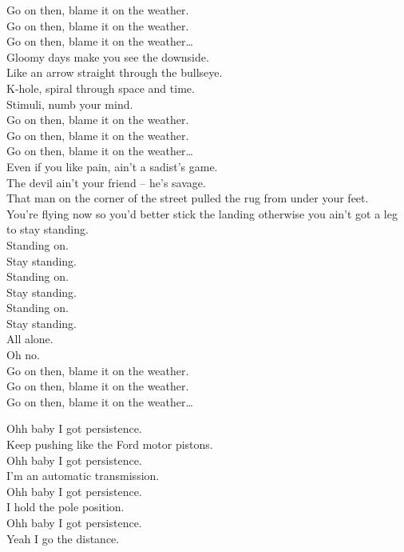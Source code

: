 Go on then, blame it on the weather. \\
Go on then, blame it on the weather. \\
Go on then, blame it on the weather… \\

Gloomy days make you see the downside. \\
Like an arrow straight through the bullseye. \\
K-hole, spiral through space and time. \\
Stimuli, numb your mind. \\

Go on then, blame it on the weather. \\
Go on then, blame it on the weather. \\
Go on then, blame it on the weather… \\

Even if you like pain,  ain't a sadist's game. \\
The devil ain't your friend -- he's savage. \\
That man on the corner of the street pulled the rug from under your feet. \\
You're flying now so you'd better stick the landing otherwise you ain't got a leg to stay standing. \\
Standing on. \\

Stay standing. \\
Standing on. \\
Stay standing. \\
Standing on. \\
Stay standing. \\
All alone. \\
Oh no. \\

Go on then, blame it on the weather. \\
Go on then, blame it on the weather. \\
Go on then, blame it on the weather… \\




Ohh baby I got persistence. \\
Keep pushing like the Ford motor pistons. \\
Ohh baby I got persistence. \\
I'm an automatic transmission. \\
Ohh baby I got persistence. \\
I hold the pole position. \\
Ohh baby I got persistence. \\
Yeah I go the distance. \\

